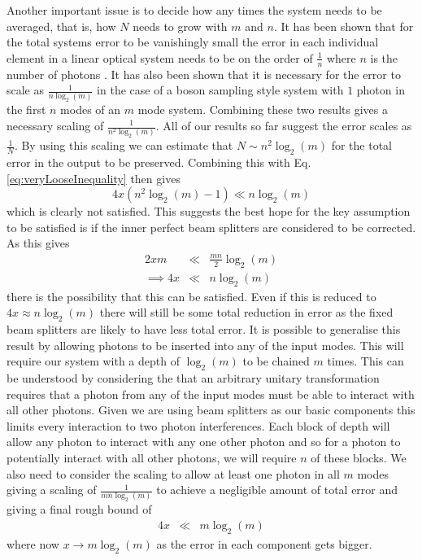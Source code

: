 \documentclass[aps,pra,twocolumn,superscriptaddress,numerical,floatfix]{revtex4-1}
\begin{document}
Another important issue is to decide how any times the system needs to be averaged, that is, how $N$ needs to grow with $m$ and $n$. It has been shown that for the total systems error to be vanishingly small the error in each individual element in a linear optical system needs to be on the order of $\frac{1}{n}$ where $n$ is the number of photons \cite{arkhipov2014}. It has also been shown that it is necessary for the error to scale as $\frac{1}{n\log_{2}\left(m\right)}$ \cite{Boson} in the case of a boson sampling style system with $1$ photon in the first $n$ modes of an $m$ mode system. Combining these two results gives a necessary scaling of $\frac{1}{n^{2}\log_{2}\left(m\right)}$. All of our results so far suggest the error scales as $\frac{1}{N}$. By using this scaling we can estimate that $N\sim n^{2}\log_{2}\left(m\right)$ for the total error in the output to be preserved. Combining this with Eq. \ref{eq:veryLooseInequality} then gives
\begin{equation}
4x\left(n^{2}\log_{2}\left(m\right)-1\right)\ll n\log_{2}\left(m\right)\label{eq:LooseInequality}
\end{equation}
which is clearly not satisfied. This suggests the best hope for the key assumption to be satisfied is if the inner perfect beam splitters are considered to be corrected. As this gives
\begin{eqnarray}
2xm & \ll & \frac{mn}{2}\log_{2}\left(m\right)\nonumber \\
\implies4x & \ll & n\log_{2}\left(m\right)\label{eq:aBetterInequality}
\end{eqnarray}
there is the possibility that this can be satisfied. Even if this is reduced to $4x\approx n\log_{2}\left(m\right)$ there will still be some total reduction in error as the fixed beam splitters are likely to have less total error. It is possible to generalise this result by allowing photons to be inserted into any of the input modes. This will require our system with a depth of $\log_{2}\left(m\right)$ to be chained $m$  times. This can be understood by considering the that an arbitrary unitary transformation requires that a photon from any of the  input modes must be able to interact with all other photons. Given we are using beam splitters as our basic components this limits every interaction to two photon interferences. Each block of depth  will allow any photon to interact with any one other photon and so for a photon to potentially interact with all other photons, we will require $n$ of these blocks. We also need to consider the scaling to allow at least one photon in all $m$ modes giving a scaling of $\frac{1}{mn\log_{2}\left(m\right)}$ to achieve a negligible amount of total error and giving a final rough bound of
\begin{eqnarray}
4x & \ll & m\log_{2}\left(m\right)\label{eq:aDifferentInequality}
\end{eqnarray}
where now $x\rightarrow m\log_{2}\left(m\right)$ as the error in each component gets bigger.
\end{document}

